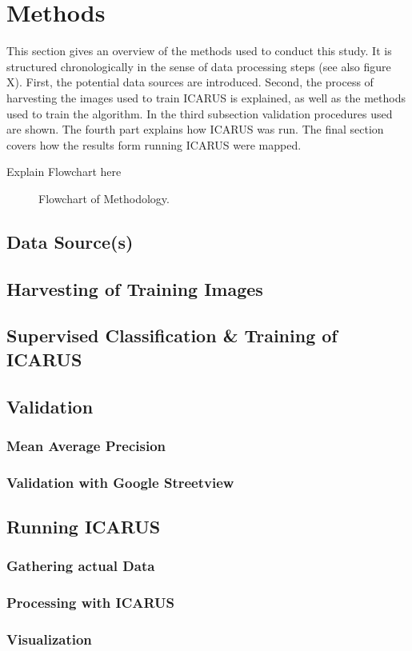 \section{Methods}
	This section gives an overview of the methods used to conduct this study. It is structured chronologically in the sense of data processing steps (see also figure X). First, the potential data sources are introduced. Second, the process of harvesting the images used to train ICARUS is explained, as well as the methods used to train the algorithm. In the third subsection validation procedures used are shown. The fourth part explains how ICARUS was run. The final section covers how the results form running ICARUS were mapped.
	\bigskip
	
	Explain Flowchart here
	
	\bigskip
	
	\begin{figure}
        \centering
	    
	    \caption{Flowchart of Methodology.}
	\end{figure}

	\bigskip
	
	\newpage
	    
	    \subsection{Data Source(s)}
		\subsection{Harvesting of Training Images}
		\subsection{Supervised Classification & Training of ICARUS}
		\subsection{Validation}
		    \subsubsection{Mean Average Precision}
		    \subsubsection{Validation with Google Streetview}
		\subsection{Running ICARUS}
		    \subsubsection{Gathering actual Data}
		    \subsubsection{Processing with ICARUS}
		\subsubsection{Visualization}
